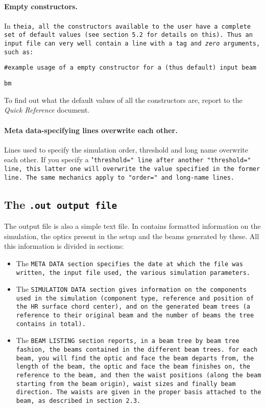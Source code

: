 \documentclass{article}
\begin{document}
\paragraph{Empty constructors.}In \tt{theia}, all the constructors available to the user have a complete set of default values (see section 5.2 for details on this). Thus an input file can very well contain a line with a tag and \textit{zero} arguments, such as:

\tt{\#example usage of a empty constructor for a (thus default) input beam}

\tt{bm}


To find out what the default values of all the constructors are, report to the \textit{Quick Reference} document.


\paragraph{Meta data-specifying lines overwrite each other.}Lines used to specify the simulation order, threshold and long name overwrite each other. If you specify a "\tt{threshold=}" line after another "\tt{threshold=}" line, this latter one will overwrite the value specified in the former line. The same mechanics apply to "\tt{order=}" and long-name lines.

\subsection{The \tt{.out} output file}
The output file is also a simple text file. In contains formatted information on the simulation, the optics present in the setup and the beams generated by these. All this information is divided in sections:

\begin{itemize}
\item The \tt{META DATA} section specifies the date at which the file was written, the input file used, the various simulation parameters.

\item The \tt{SIMULATION DATA} section gives information on the components used in the simulation (component type, reference and position of the HR surface chord center), and on the generated beam trees (a reference to their original beam and the number of beams the tree contains in total).

\item The \tt{BEAM LISTING} section reports, in a beam tree by beam tree fashion, the beams  contained in the different beam trees. for each beam, you will find the optic and face the beam departs from, the length of the beam, the optic and face the beam finishes on, the reference to the beam, and then the waist positions (along the beam starting from the beam origin), waist sizes and finally beam direction. The waists are given in the proper basis attached to the beam, as described in section 2.3.
\end{itemize}
\end{document}

